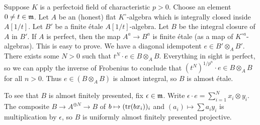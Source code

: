 \documentclass{article}
\begin{document}
Suppose $K$ is a perfectoid field of characteristic $p>0$. Choose an element 
$0\ne t\in\mathfrak{m}$. Let $A$ be an (honest) flat $K^\circ$-algebra which is integrally 
closed inside $A[1/t]$. Let $B'$ be a finite \'etale $A[1/t]$-algebra. Let $B$ 
be the integral closure of $A$ in $B'$. If $A$ is perfect, then the map 
$A^a \to B^a$ is finite \'etale (as a map of $K^{\circ a}$-algebras). This is easy 
to prove. We have a diagonal idempotent $e\in B'\otimes_A B'$. There exists 
some $N>0$ such that $t^N\cdot e\in B\otimes_A B$. Everything in sight is 
perfect, so we can apply the inverse of Frobenius to conclude that 
$(t^N)^{1/p^n}\cdot e\in B\otimes_A B$ for all $n>0$. Thus  
$e\in (B\otimes_A B)$ is almost integral, so $B$ is almost \'etale. 

To see that $B$ is almost finitely presented, fix $\epsilon\in\mathfrak{m}$. Write 
$\epsilon\cdot e = \sum_{i=1}^N x_i\otimes y_i$. The composite 
$B\to A^{\oplus N} \to B$ of $b\mapsto (\operatorname{tr}(b x_i))_i$ and 
$(a_i)\mapsto \sum a_i y_i$ is multiplication by $\epsilon$, so $B$ is uniformly almost 
finitely presented projective. 
\end{document}
